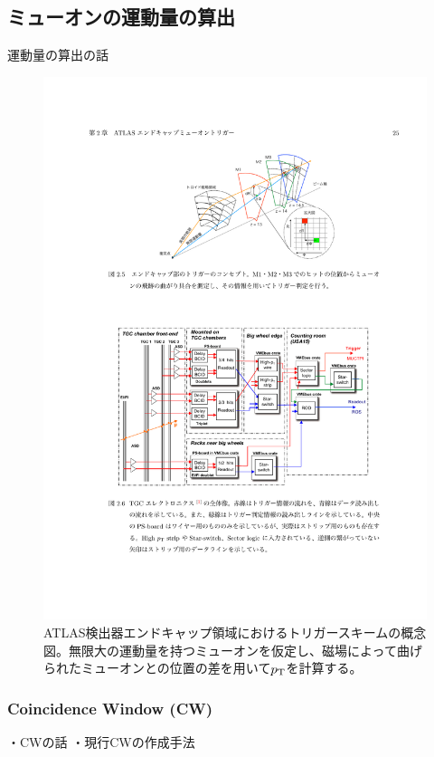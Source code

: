 \subsection{ミューオンの運動量の算出}
運動量の算出の話
\begin{figure}[tb]
  \centering
  \includegraphics[clip, width=14cm]{fig/3/akatsuka_mt_trigger_scheme.pdf}
  \caption{ATLAS検出器エンドキャップ領域におけるトリガースキームの概念図\cite{article:akatsuka-mron}。無限大の運動量を持つミューオンを仮定し、磁場によって曲げられたミューオンとの位置の差を用いて$p_\mathrm{T}$を計算する。}
  \label{fig:trigger-scheme}
\end{figure}

\subsubsection{Coincidence Window (CW)}
・CWの話
・現行CWの作成手法

